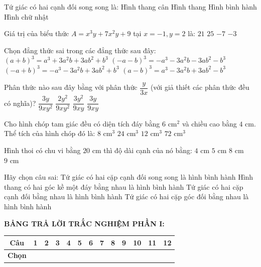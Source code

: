 \documentclass[12pt,a4paper]{article}
\begin{document}
\begin{ex}
Tứ giác có hai cạnh đối song song là:
\choice
{Hình thang cân}
{\True Hình thang}
{Hình bình hành}
{Hình chữ nhật}
\end{ex}

\begin{ex}
Giá trị của biểu thức $A = x^3y + 7x^2y + 9$ tại $x = -1, y = 2$ là:
\choice
{\True $21$}
{$25$}
{$-7$}
{$-3$}
\end{ex}

\begin{ex}
Chọn đẳng thức sai trong các đẳng thức sau đây:
\choice
{$(a + b)^3 = a^3 + 3a^2b + 3ab^2 + b^3$}
{$(-a - b)^3 = -a^3 - 3a^2b - 3ab^2 - b^3$}
{\True $(-a + b)^3 = -a^3 - 3a^2b + 3ab^2 + b^3$}
{$(a - b)^3 = a^3 - 3a^2b + 3ab^2 - b^3$}
\end{ex}

\begin{ex}
Phân thức nào sau đây bằng với phân thức $\dfrac{y}{3x}$ (với giả thiết các phân thức đều có nghĩa)?
\choice
{$\dfrac{3y}{9xy^2}$}
{$\dfrac{2y^2}{9xy^2}$}
{\True $\dfrac{3y^2}{9xy}$}
{$\dfrac{3y}{9xy}$}
\end{ex}

\begin{ex}
Cho hình chóp tam giác đều có diện tích đáy bằng $6\text{ cm}^2$ và chiều cao bằng $4\text{ cm}$. Thể tích của hình chóp đó là:
\choice
{\True $8\text{ cm}^3$}
{$24\text{ cm}^3$}
{$12\text{ cm}^3$}
{$72\text{ cm}^3$}
\end{ex}

\begin{ex}
Hình thoi có chu vi bằng $20\text{ cm}$ thì độ dài cạnh của nó bằng:
\choice
{$4\text{ cm}$}
{\True $5\text{ cm}$}
{$8\text{ cm}$}
{$9\text{ cm}$}
\end{ex}

\begin{ex}
Hãy chọn câu sai:
\choice
{Tứ giác có hai cặp cạnh đối song song là hình bình hành}
{\True Hình thang có hai góc kề một đáy bằng nhau là hình bình hành}
{Tứ giác có hai cặp cạnh đối bằng nhau là hình bình hành}
{Tứ giác có hai cặp góc đối bằng nhau là hình bình hành}
\end{ex}


\vspace{1mm}
\noindent\textbf{BẢNG TRẢ LỜI TRẮC NGHIỆM PHẦN I:}
\begin{center}
\begin{tabular}{|c|c|c|c|c|c|c|c|c|c|c|c|c|}
\hline
\textbf{Câu} & \textbf{1} & \textbf{2} & \textbf{3} & \textbf{4} & \textbf{5} & \textbf{6} & \textbf{7} & \textbf{8} & \textbf{9} & \textbf{10} & \textbf{11} & \textbf{12} \\
\hline
\textbf{Chọn} & \rule{0pt}{0.65cm} & & & & & & & & & & & \\
\hline
\end{tabular}
\end{center}
\vspace{2mm}
\end{document}
